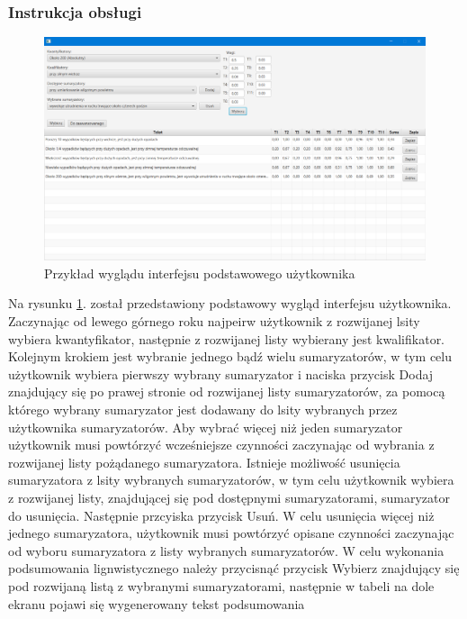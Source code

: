 \documentclass{classrep}
\begin{document}
\newpage

\subsubsection{Instrukcja obsługi}

\begin{figure}[h!]
 \centering
 \includegraphics[width=15cm]{gui.png}
 \vspace{-0.3cm}
 \caption{Przykład wyglądu interfejsu podstawowego użytkownika}
 \label{gui}
\end{figure}

Na rysunku \ref{gui}. został przedstawiony podstawowy wygląd interfejsu użytkownika. Zaczynając od lewego górnego roku najpeirw użytkownik z rozwijanej lsity wybiera kwantyfikator, następnie z rozwijanej listy wybierany jest kwalifikator. Kolejnym krokiem jest wybranie jednego bądź wielu sumaryzatorów, w tym celu użytkownik wybiera pierwszy wybrany sumaryzator i naciska przycisk Dodaj znajdujący się po prawej stronie od rozwijanej listy sumaryzatorów, za pomocą którego wybrany sumaryzator jest dodawany do lsity wybranych przez użytkownika sumaryzatorów. Aby wybrać więcej niż jeden sumaryzator użytkownik musi powtórzyć wcześniejsze czynności zaczynając od wybrania z rozwijanej listy pożądanego sumaryzatora. Istnieje możliwość usunięcia sumaryzatora z lsity wybranych sumaryzatorów, w tym celu użytkownik wybiera z rozwijanej listy, znajdującej się pod dostępnymi sumaryzatorami, sumaryzator do usunięcia. Następnie przcyiska przycisk Usuń. W celu usunięcia więcej niż jednego sumaryzatora, użytkownik musi powtórzyć opisane czynności zaczynając od wyboru sumaryzatora z listy wybranych sumaryzatorów. W celu wykonania podsumowania lignwistycznego należy przycisnąć przycisk Wybierz znajdujący się pod rozwijaną listą z wybranymi sumaryzatorami, następnie w tabeli na dole ekranu pojawi się wygenerowany tekst podsumowania
\end{document}
